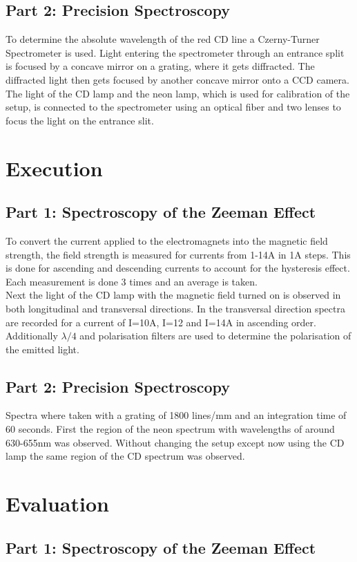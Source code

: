 \documentclass[12pt]{article}
\begin{document}
\subsection{Part 2: Precision Spectroscopy}
To determine the absolute wavelength of the red CD line a Czerny-Turner Spectrometer is used. Light entering the spectrometer through an entrance split is focused by a concave mirror on a grating, where it gets diffracted. The diffracted light then gets focused by another concave mirror onto a CCD camera. The light of the CD lamp and the neon lamp, which is used for calibration of the setup, is connected to the spectrometer using an optical fiber and two lenses to focus the light on the entrance slit. 

\section{Execution}
\subsection{Part 1: Spectroscopy of the Zeeman Effect}
To convert the current applied to the electromagnets into the magnetic field strength, the field strength is measured for currents from 1-14A in 1A steps. This is done for ascending and descending currents to account for the hysteresis effect. Each measurement is done 3 times and an average is taken.
\\Next the light of the CD lamp with the magnetic field turned on is observed in both longitudinal and transversal directions. In the transversal direction spectra are recorded for a current of I=10A, I=12 and I=14A in ascending order. Additionally $\lambda/4$ and polarisation filters are used to determine the polarisation of the emitted light. 
\subsection{Part 2: Precision Spectroscopy}
Spectra where taken with a grating of 1800 lines/mm and an integration time of 60 seconds. First the region of the neon spectrum with wavelengths of around 630-655nm was observed. Without changing the setup except now using the CD lamp the same region of the CD spectrum was observed. 
\section{Evaluation}
\subsection{Part 1: Spectroscopy of the Zeeman Effect}
\end{document}
